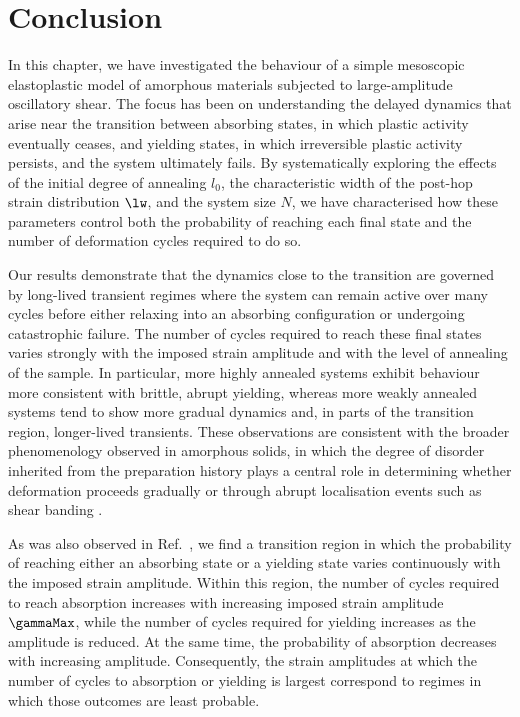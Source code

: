 \documentclass[asymmetricmargins]{library/duthesis}%
\begin{document}
\section{Conclusion} \label{sec:FatigueConclusion}

In this chapter, we have investigated the behaviour of a simple mesoscopic elastoplastic model of amorphous materials subjected to large-amplitude oscillatory shear. The focus has been on understanding the delayed dynamics that arise near the transition between absorbing states, in which plastic activity eventually ceases, and yielding states, in which irreversible plastic activity persists, and the system ultimately fails. By systematically exploring the effects of the initial degree of annealing $l_0$, the characteristic width of the post-hop strain distribution $\lw$, and the system size $N$, we have characterised how these parameters control both the probability of reaching each final state and the number of deformation cycles required to do so.

Our results demonstrate that the dynamics close to the transition are governed by long-lived transient regimes where the system can remain active over many cycles before either relaxing into an absorbing configuration or undergoing catastrophic failure. The number of cycles required to reach these final states varies strongly with the imposed strain amplitude and with the level of annealing of the sample. In particular, more highly annealed systems exhibit behaviour more consistent with brittle, abrupt yielding, whereas more weakly annealed systems tend to show more gradual dynamics and, in parts of the transition region, longer-lived transients. These observations are consistent with the broader phenomenology observed in amorphous solids, in which the degree of disorder inherited from the preparation history plays a central role in determining whether deformation proceeds gradually or through abrupt localisation events such as shear banding \cite{pollard_yielding_2022,liuFateShearoscillatedAmorphous2022,khandareElastoplasticModellingCyclic2026}.

As was also observed in Ref.~\cite{khandareElastoplasticModellingCyclic2026}, we find a transition region in which the probability of reaching either an absorbing state or a yielding state varies continuously with the imposed strain amplitude. Within this region, the number of cycles required to reach absorption increases with increasing imposed strain amplitude $\gammaMax$, while the number of cycles required for yielding increases as the amplitude is reduced. At the same time, the probability of absorption decreases with increasing amplitude. Consequently, the strain amplitudes at which the number of cycles to absorption or yielding is largest correspond to regimes in which those outcomes are least probable.
\end{document}
